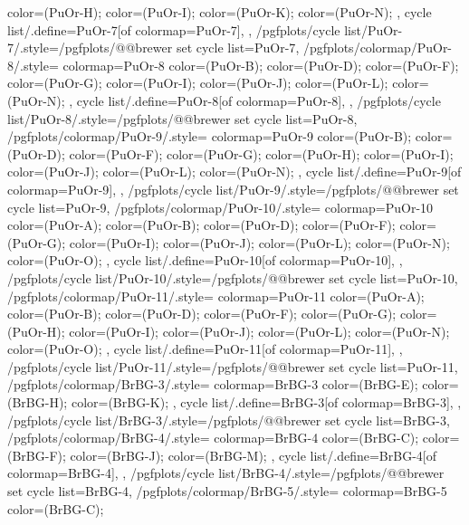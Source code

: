 {{{      color=(PuOr-H);
      color=(PuOr-I);
      color=(PuOr-K);
      color=(PuOr-N);
    },
    cycle list/.define={PuOr-7}{[of colormap=PuOr-7]},
  },
  /pgfplots/cycle list/PuOr-7/.style={/pgfplots/@@brewer set cycle list={PuOr-7}},
  /pgfplots/colormap/PuOr-8/.style={
    colormap={PuOr-8}{
      color=(PuOr-B);
      color=(PuOr-D);
      color=(PuOr-F);
      color=(PuOr-G);
      color=(PuOr-I);
      color=(PuOr-J);
      color=(PuOr-L);
      color=(PuOr-N);
    },
    cycle list/.define={PuOr-8}{[of colormap=PuOr-8]},
  },
  /pgfplots/cycle list/PuOr-8/.style={/pgfplots/@@brewer set cycle list={PuOr-8}},
  /pgfplots/colormap/PuOr-9/.style={
    colormap={PuOr-9}{
      color=(PuOr-B);
      color=(PuOr-D);
      color=(PuOr-F);
      color=(PuOr-G);
      color=(PuOr-H);
      color=(PuOr-I);
      color=(PuOr-J);
      color=(PuOr-L);
      color=(PuOr-N);
    },
    cycle list/.define={PuOr-9}{[of colormap=PuOr-9]},
  },
  /pgfplots/cycle list/PuOr-9/.style={/pgfplots/@@brewer set cycle list={PuOr-9}},
  /pgfplots/colormap/PuOr-10/.style={
    colormap={PuOr-10}{
      color=(PuOr-A);
      color=(PuOr-B);
      color=(PuOr-D);
      color=(PuOr-F);
      color=(PuOr-G);
      color=(PuOr-I);
      color=(PuOr-J);
      color=(PuOr-L);
      color=(PuOr-N);
      color=(PuOr-O);
    },
    cycle list/.define={PuOr-10}{[of colormap=PuOr-10]},
  },
  /pgfplots/cycle list/PuOr-10/.style={/pgfplots/@@brewer set cycle list={PuOr-10}},
  /pgfplots/colormap/PuOr-11/.style={
    colormap={PuOr-11}{
      color=(PuOr-A);
      color=(PuOr-B);
      color=(PuOr-D);
      color=(PuOr-F);
      color=(PuOr-G);
      color=(PuOr-H);
      color=(PuOr-I);
      color=(PuOr-J);
      color=(PuOr-L);
      color=(PuOr-N);
      color=(PuOr-O);
    },
    cycle list/.define={PuOr-11}{[of colormap=PuOr-11]},
  },
  /pgfplots/cycle list/PuOr-11/.style={/pgfplots/@@brewer set cycle list={PuOr-11}},
  /pgfplots/colormap/BrBG-3/.style={
    colormap={BrBG-3}{
      color=(BrBG-E);
      color=(BrBG-H);
      color=(BrBG-K);
    },
    cycle list/.define={BrBG-3}{[of colormap=BrBG-3]},
  },
  /pgfplots/cycle list/BrBG-3/.style={/pgfplots/@@brewer set cycle list={BrBG-3}},
  /pgfplots/colormap/BrBG-4/.style={
    colormap={BrBG-4}{
      color=(BrBG-C);
      color=(BrBG-F);
      color=(BrBG-J);
      color=(BrBG-M);
    },
    cycle list/.define={BrBG-4}{[of colormap=BrBG-4]},
  },
  /pgfplots/cycle list/BrBG-4/.style={/pgfplots/@@brewer set cycle list={BrBG-4}},
  /pgfplots/colormap/BrBG-5/.style={
    colormap={BrBG-5}{
      color=(BrBG-C);
}}}
